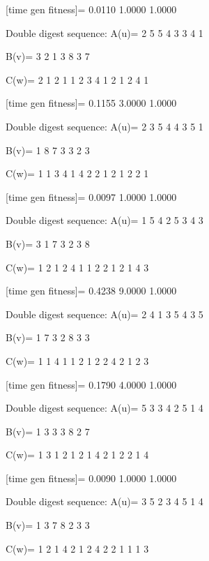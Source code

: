 [time gen fitness]=
    0.0110    1.0000    1.0000

Double digest sequence:
A(u)=
     2     5     5     4     3     3     4     1

B(v)=
     3     2     1     3     8     3     7

C(w)=
     2     1     2     1     1     2     3     4     1     2     1     2     4     1

[time gen fitness]=
    0.1155    3.0000    1.0000

Double digest sequence:
A(u)=
     2     3     5     4     4     3     5     1

B(v)=
     1     8     7     3     3     2     3

C(w)=
     1     1     3     4     1     4     2     2     1     2     1     2     2     1

[time gen fitness]=
    0.0097    1.0000    1.0000

Double digest sequence:
A(u)=
     1     5     4     2     5     3     4     3

B(v)=
     3     1     7     3     2     3     8

C(w)=
     1     2     1     2     4     1     1     2     2     1     2     1     4     3

[time gen fitness]=
    0.4238    9.0000    1.0000

Double digest sequence:
A(u)=
     2     4     1     3     5     4     3     5

B(v)=
     1     7     3     2     8     3     3

C(w)=
     1     1     4     1     1     2     1     2     2     4     2     1     2     3

[time gen fitness]=
    0.1790    4.0000    1.0000

Double digest sequence:
A(u)=
     5     3     3     4     2     5     1     4

B(v)=
     1     3     3     3     8     2     7

C(w)=
     1     3     1     2     1     2     1     4     2     1     2     2     1     4

[time gen fitness]=
    0.0090    1.0000    1.0000

Double digest sequence:
A(u)=
     3     5     2     3     4     5     1     4

B(v)=
     1     3     7     8     2     3     3

C(w)=
     1     2     1     4     2     1     2     4     2     2     1     1     1     3

